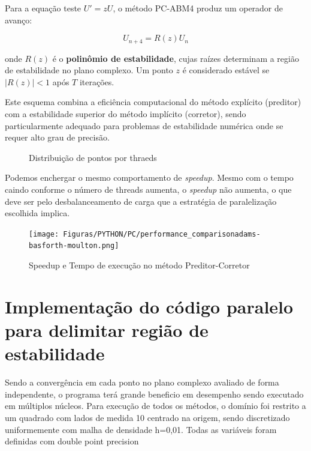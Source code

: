 \documentclass[a4paper,12pt]{article}
\begin{document}
Para a equação teste $U' = zU$, o método PC-ABM4 produz um operador de avanço:

\[
U_{n+4} = R(z)U_n
\]

onde $R(z)$ é o \textbf{polinômio de estabilidade}, cujas raízes determinam a região de estabilidade no plano complexo. Um ponto $z$ é considerado estável se $|R(z)| < 1$ após $T$ iterações.

Este esquema combina a eficiência computacional do método explícito (preditor) com a estabilidade superior do método implícito (corretor), sendo particularmente adequado para problemas de estabilidade numérica onde se requer alto grau de precisão.

\begin{figure}[H]
\centering
{} %
\quad %
\caption{Distribuição de pontos por thraeds}
\label{fig:euler_implicito}
\end{figure}

Podemos enchergar o mesmo comportamento de \textit{speedup}. Mesmo com o tempo caindo conforme o número de threads aumenta, o \textit{speedup} não aumenta, o que deve ser pelo desbalanceamento de carga que a estratégia de paralelização escolhida implica. 

\begin{figure}[H]
   \centering
   \texttt{[image: Figuras/PYTHON/PC/performance\_comparisonadams-basforth-moulton.png]}
   \caption{Speedup e Tempo de execução no método Preditor-Corretor}
   \label{fig:speed_threads}
\end{figure}


\section{Implementação do código paralelo para delimitar região de estabilidade}
Sendo a convergência em cada ponto no plano complexo avaliado de forma independente, o programa terá grande beneficio em desempenho sendo executado em múltiplos núcleos.
Para execução de todos os métodos, o domínio foi restrito a um quadrado com lados de medida 10 centrado na origem, sendo discretizado uniformemente com malha de densidade h=0,01. 
Todas as variáveis foram definidas com double point precision  
\end{document}
